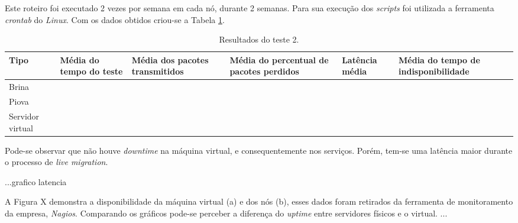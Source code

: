 Este roteiro foi executado 2 vezes por semana em cada nó, durante 2 semanas. Para sua execução dos \textit{scripts} foi utilizada a ferramenta 
\textit{crontab} do \textit{Linux}. Com os dados obtidos criou-se a Tabela \ref{tab:teste2resultados}.


\begin{table}[h!]
\caption{Resultados do teste 2.}
\label{tab:teste2resultados}
\begin{center}
\begin{tabular}{|l|p{2.5cm}|p{2.5cm}|p{2.5cm}|p{2.5cm}|p{3cm}|}\hline
\textbf{Tipo} & \textbf{Média do tempo do teste} & \textbf{Média dos pacotes transmitidos} & \textbf{Média do percentual de pacotes perdidos} & \textbf{Latência média} & \textbf{Média do tempo de indisponibilidade} \\\hline
Brina & & & & & \\\hline
Piova & & & & & \\\hline
Servidor virtual & & & & & \\\hline
\end{tabular}
\end{center}
\end{table}

Pode-se observar que não houve \textit{downtime} na máquina virtual, e consequentemente nos serviços.
Porém, tem-se uma latência maior durante o processo de \textit{live migration}.

...grafico latencia

A Figura X demonstra a disponibilidade da máquina virtual (a) e dos nós (b), esses dados foram retirados da ferramenta de monitoramento da empresa,
\textit{Nagios}. Comparando os gráficos pode-se perceber a diferença do \textit{uptime} entre servidores físicos e o virtual.
...

